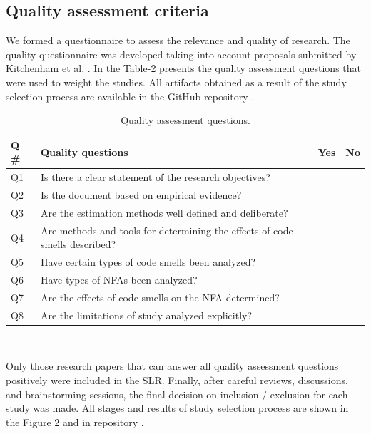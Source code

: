 \documentclass{sigchi}
\begin{document}
\subsection{Quality assessment criteria}
We formed a questionnaire to assess the relevance and quality of research. The quality questionnaire was developed taking into account proposals submitted by Kitchenham et al. \cite{Kitchenham}. In the Table-2 presents the quality assessment questions that were used to weight the studies. All artifacts obtained as a result of the study selection process are available in the GitHub repository \cite{Munalbayeva}. 

\begin{table}[h]
	\small
	\begin{tabular}{ p{5mm} |  p{65mm} | p{3mm} | p{3mm}}
		\toprule
		\textbf{Q \#} & \textbf{Quality questions} & \textbf{Yes} & \textbf{No}\\
		\midrule
		Q1 & Is there a clear statement of the research objectives?  & & \\
		Q2 & Is the document based on empirical evidence?  & & \\
		Q3 & Are the estimation methods well defined and deliberate? & & \\
		Q4 & Are methods and tools for determining the effects of code smells described? & & \\
		Q5 & Have certain types of code smells been analyzed? & & \\
		Q6 & Have types of NFAs been analyzed?& & \\
		Q7 & Are the effects of code smells on the NFA determined?& & \\
		Q8 & Are the limitations of study analyzed explicitly?& & \\
		\bottomrule
	\end{tabular}
	\caption{Quality assessment questions.}~\label{tab:assess_criteria}
\end{table}

Only those research papers that can answer all quality assessment questions positively were included in the SLR. Finally, after careful reviews, discussions, and brainstorming sessions, the final decision on inclusion / exclusion for each study was made. All stages and results of study selection process are shown in the Figure 2 and in repository \cite{Munalbayeva}.
\end{document}
